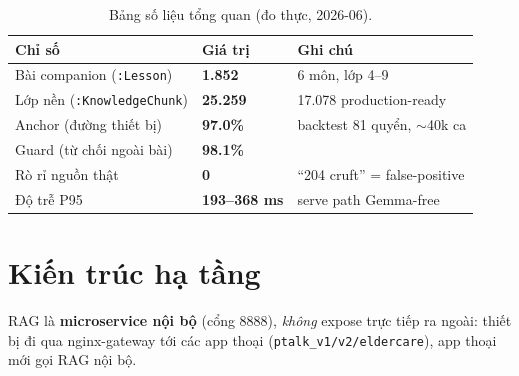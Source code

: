 \documentclass[11pt,a4paper]{article}
\newcommand{\metric}[1]{{\sffamily\bfseries\color{cprim}#1}}
\begin{document}
\begin{table}[h]\centering\small\sffamily
\begin{tabular}{lll}
\toprule
\textbf{Chỉ số} & \textbf{Giá trị} & \textbf{Ghi chú}\\
\midrule
Bài companion (\texttt{:Lesson}) & \metric{1.852} & 6 môn, lớp 4--9 \\
Lớp nền (\texttt{:KnowledgeChunk}) & \metric{25.259} & 17.078 production-ready \\
Anchor (đường thiết bị) & \metric{97.0\%} & backtest 81 quyển, $\sim$40k ca \\
Guard (từ chối ngoài bài) & \metric{98.1\%} & \\
Rò rỉ nguồn thật & \metric{0} & ``204 cruft'' = false-positive \\
Độ trễ P95 & \metric{193--368 ms} & serve path Gemma-free \\
\bottomrule
\end{tabular}
\caption{Bảng số liệu tổng quan (đo thực, 2026-06).}
\end{table}

\section{Kiến trúc hạ tầng}
RAG là \textbf{microservice nội bộ} (cổng 8888), \emph{không} expose trực tiếp ra ngoài: thiết bị đi qua
nginx-gateway tới các app thoại (\texttt{ptalk\_v1/v2/eldercare}), app thoại mới gọi RAG nội bộ.
\end{document}
